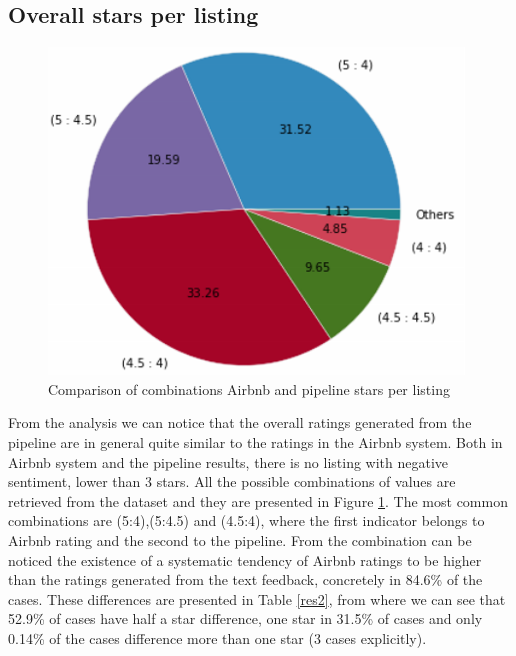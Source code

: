 \subsection{Overall stars per listing}
%
\begin{figure}
\centering
	\includegraphics[height=0.27\textheight]{star_combinations}
	\caption{Comparison of combinations Airbnb and pipeline stars per listing}
	\label{fig:comb1}
\end{figure}
%
From the analysis we can notice that the overall ratings generated from the pipeline are in general quite similar to the ratings in the Airbnb system. Both in Airbnb system and the pipeline results, there is no listing with negative sentiment, lower than 3 stars. All the possible combinations of values are retrieved from the dataset and they are presented in Figure \ref{fig:comb1}. The most common combinations are (5:4),(5:4.5) and (4.5:4), where the first indicator belongs to Airbnb rating and the second to the pipeline. From the combination can be noticed the existence of a systematic tendency of Airbnb ratings to be higher than the ratings generated from the text feedback, concretely in 84.6\% of the cases. These differences are presented in Table \ref{res2}, from where we can see that 52.9\% of cases have half a star difference, one star in 31.5\% of cases and only 0.14\% of the cases difference more than one star (3 cases explicitly). 
%
